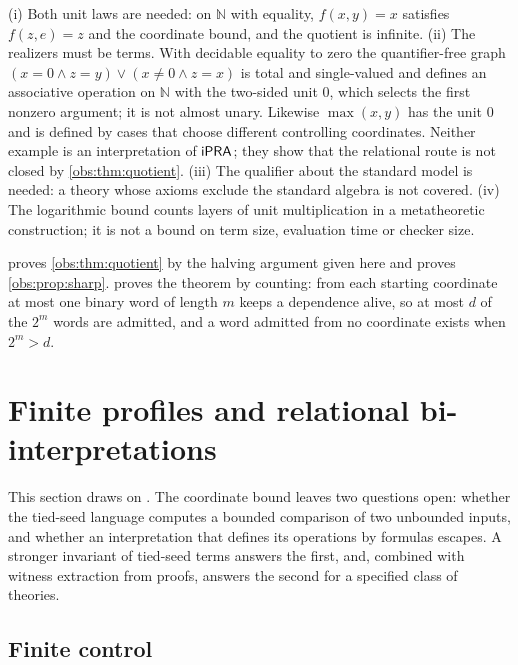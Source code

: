 \begin{remark}[Limits]
\label{obs:rem:quotient-limits}
(i) Both unit laws are needed: on $\mathbb{N}$ with equality, $f(x,y)=x$
satisfies $f(z,e)=z$ and the coordinate bound, and the quotient is infinite.
(ii) The realizers must be terms. With decidable equality to zero the
quantifier-free graph
$(x=0\wedge z=y)\vee(x\ne 0\wedge z=x)$ is total and single-valued and defines
an associative operation on $\mathbb{N}$ with the two-sided unit $0$, which
selects the first nonzero argument; it is not almost unary. Likewise
$\max(x,y)$ has the unit $0$ and is defined by cases that choose different
controlling coordinates. Neither example is an interpretation of $\mathsf{iPRA}$; they
show that the relational route is not closed by \cref{obs:thm:quotient}. (iii)
The qualifier about the standard model is needed: a theory whose axioms exclude
the standard algebra is not covered. (iv) The logarithmic bound counts layers
of unit multiplication in a metatheoretic construction; it is not a bound on
term size, evaluation time or checker size.
\end{remark}

\begin{remark}
 proves \cref{obs:thm:quotient} by the halving argument
given here and proves \cref{obs:prop:sharp}.  proves the
theorem by counting: from each starting coordinate at most one binary word of
length $m$ keeps a dependence alive, so at most $d$ of the $2^m$ words are
admitted, and a word admitted from no coordinate exists when $2^m>d$.
\end{remark}

\section{Finite profiles and relational bi-interpretations}
\label{obs:sec:profiles}

This section draws on . The coordinate bound leaves two
questions open: whether the tied-seed language computes a bounded comparison of
two unbounded inputs, and whether an interpretation that defines its operations
by formulas escapes. A stronger invariant of tied-seed terms answers the first,
and, combined with witness extraction from proofs, answers the second for a
specified class of theories.

\subsection{Finite control}

